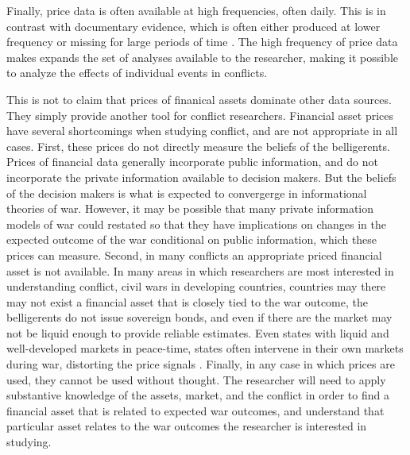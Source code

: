 Finally, price data is often available at high frequencies, often daily.
This is in contrast with documentary evidence, which is often either produced at lower frequency or missing for large periods of time \parencite[][57]{Reiter2009}.
The high frequency of price data makes expands the set of analyses available to the researcher, making it possible to analyze the effects of individual events in conflicts.

This is not to claim that prices of finanical assets dominate other data sources.
They simply provide another tool for conflict researchers.
Financial asset prices have several shortcomings when studying conflict, and are not appropriate in all cases.
First, these prices do not directly measure the beliefs of the belligerents.
Prices of financial data generally incorporate public information, and do not incorporate the private information available to decision makers.
But the beliefs of the decision makers is what is expected to convergerge in informational theories of war.
However, it may be possible that many private information models of war could restated so that they have implications on changes in the expected outcome of the war conditional on public information, which these prices can measure.
Second, in many conflicts an appropriate priced financial asset is not available.
In many areas in which researchers are most interested in understanding conflict, \eg{} civil wars in developing countries, countries may there may not exist a financial asset  that is closely tied to the war outcome, \eg{} the belligerents do not issue sovereign bonds, and even if there are the market may not be liquid enough to provide reliable estimates.
Even states with liquid and well-developed markets in peace-time, states often intervene in their own markets during war, distorting the price signals \parencite[12]{HaberMitchenerOosterlinckEtAl2015}.
Finally, in any case in which prices are used, they cannot be used without thought.
The researcher will need to apply substantive knowledge of the assets, market, and the conflict in order to find a financial asset that is related to expected war outcomes, and understand that particular asset relates to the war outcomes  the researcher is interested in studying.




